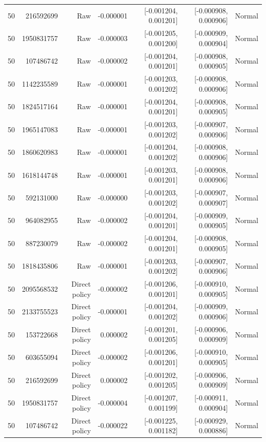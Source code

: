 \begin{longtable}{lrrrrrr}
50 & 216592699 & Raw & -0.000001 & [-0.001204, 0.001201] & [-0.000908, 0.000906] & Normal \\
50 & 1950831757 & Raw & -0.000003 & [-0.001205, 0.001200] & [-0.000909, 0.000904] & Normal \\
50 & 107486742 & Raw & -0.000002 & [-0.001204, 0.001201] & [-0.000908, 0.000905] & Normal \\
50 & 1142235589 & Raw & -0.000001 & [-0.001203, 0.001202] & [-0.000908, 0.000906] & Normal \\
50 & 1824517164 & Raw & -0.000001 & [-0.001204, 0.001201] & [-0.000908, 0.000905] & Normal \\
50 & 1965147083 & Raw & -0.000001 & [-0.001203, 0.001202] & [-0.000907, 0.000906] & Normal \\
50 & 1860620983 & Raw & -0.000001 & [-0.001204, 0.001202] & [-0.000908, 0.000906] & Normal \\
50 & 1618144748 & Raw & -0.000001 & [-0.001203, 0.001201] & [-0.000908, 0.000906] & Normal \\
50 & 592131000 & Raw & -0.000000 & [-0.001203, 0.001202] & [-0.000907, 0.000907] & Normal \\
50 & 964082955 & Raw & -0.000002 & [-0.001204, 0.001201] & [-0.000909, 0.000905] & Normal \\
50 & 887230079 & Raw & -0.000002 & [-0.001204, 0.001201] & [-0.000908, 0.000905] & Normal \\
50 & 1818435806 & Raw & -0.000001 & [-0.001203, 0.001202] & [-0.000907, 0.000906] & Normal \\
50 & 2095568532 & Direct policy & -0.000002 & [-0.001206, 0.001201] & [-0.000910, 0.000905] & Normal \\
50 & 2133755523 & Direct policy & -0.000001 & [-0.001204, 0.001202] & [-0.000909, 0.000906] & Normal \\
50 & 153722668 & Direct policy & 0.000002 & [-0.001201, 0.001205] & [-0.000906, 0.000909] & Normal \\
50 & 603655094 & Direct policy & -0.000002 & [-0.001206, 0.001201] & [-0.000910, 0.000905] & Normal \\
50 & 216592699 & Direct policy & 0.000002 & [-0.001202, 0.001205] & [-0.000906, 0.000909] & Normal \\
50 & 1950831757 & Direct policy & -0.000004 & [-0.001207, 0.001199] & [-0.000911, 0.000904] & Normal \\
50 & 107486742 & Direct policy & -0.000022 & [-0.001225, 0.001182] & [-0.000929, 0.000886] & Normal \\

\end{longtable}
